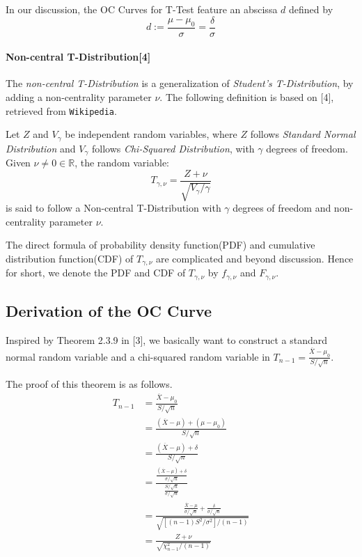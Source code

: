 \documentclass[a4paper]{article}
\begin{document}
In our discussion, the OC Curves for T-Test feature an abscissa $d$ defined by
$$d := \frac{\mu-\mu_0}{\sigma}=\frac{\delta}{\sigma}$$

\paragraph{Non-central T-Distribution[4]} 
The \textit{non-central T-Distribution} is a generalization of \textit{Student's T-Distribution}, by adding a non-centrality parameter $\nu$. The following definition is based on [4], retrieved from \texttt{Wikipedia}.

Let $Z$ and $V_\gamma$ be independent random variables, where $Z$ follows \textit{Standard Normal Distribution} and $V_\gamma$ follows \textit{Chi-Squared Distribution}, with $\gamma$ degrees of freedom. Given $\nu\neq 0\in\mathbb{R}$, the random variable:
$$T_{\gamma,\nu} = \frac{Z+\nu}{\sqrt{V_\gamma/\gamma}}$$
is said to follow a Non-central T-Distribution with $\gamma$ degrees of freedom and non-centrality parameter $\nu$.

The direct formula of probability density function(PDF) and cumulative distribution function(CDF) of $T_{\gamma,\nu}$ are complicated and beyond discussion. Hence for short, we denote the PDF and CDF of $T_{\gamma,\nu}$ by $f_{\gamma,\nu}$ and $F_{\gamma,\nu}$.
\subsection{Derivation of the OC Curve}

Inspired by Theorem 2.3.9 in [3], we basically want to construct a standard normal random variable and a chi-squared random variable in $T_{n-1}= \displaystyle\frac{\overline{X}-\mu_0}{S/\sqrt{n}}$.

The proof of this theorem is as follows. 
\begin{align*}
T_{n-1}
&= \frac{\overline{X}-\mu_0}{S/\sqrt{n}} \\
&= \frac{(\overline{X}-\mu)+(\mu-\mu_0)}{S/\sqrt{n}} \\
&= \frac{(\overline{X}-\mu)+\delta}{S/\sqrt{n}} \\
&= \frac{\displaystyle\frac{(\overline{X}-\mu)+\delta}{\sigma/\sqrt{n}}}{\displaystyle\frac{S/\sqrt{n}}{\sigma/\sqrt{n}}} \\
&= \frac{\displaystyle\frac{\overline{X}-\mu}{\sigma/\sqrt{n}}+\displaystyle\frac{\delta}{\sigma/\sqrt{n}}}{\sqrt{[(n-1)S^2/\sigma^2]/(n-1)}} \\
&= \frac{Z+\nu}{\sqrt{\chi^2_{n-1}/(n-1)}} \\
\end{align*}
\end{document}
